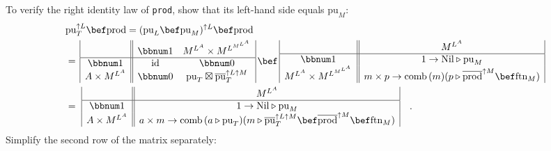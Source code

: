 To verify the right identity law of \lstinline!prod!, show that its
left-hand side equals $\text{pu}_{M}$:
\begin{align*}
 & \text{pu}_{T}^{\uparrow L}\bef\text{prod}=(\text{pu}_{L}\bef\text{pu}_{M})^{\uparrow L}\bef\text{prod}\\
 & =\,\begin{array}{|c||cc|}
 & \bbnum 1 & M^{L^{A}}\times M^{L^{M^{L^{A}}}}\\
\hline \bbnum 1 & \text{id} & \bbnum 0\\
A\times M^{L^{A}} & \bbnum 0 & \text{pu}_{T}\boxtimes\overline{\text{pu}}_{T}^{\uparrow L\uparrow M}
\end{array}\,\bef\,\begin{array}{|c||c|}
 & M^{L^{A}}\\
\hline \bbnum 1 & 1\rightarrow\text{Nil}\triangleright\text{pu}_{M}\\
M^{L^{A}}\times M^{L^{M^{L^{A}}}} & m\times p\rightarrow\text{comb}\,(m)(p\triangleright\overline{\text{prod}}^{\uparrow M}\bef\text{ftn}_{M})
\end{array}\\
 & =\,\,\begin{array}{|c||c|}
 & M^{L^{A}}\\
\hline \bbnum 1 & 1\rightarrow\text{Nil}\triangleright\text{pu}_{M}\\
A\times M^{L^{A}} & a\times m\rightarrow\text{comb}\,(a\triangleright\text{pu}_{T})(m\triangleright\overline{\text{pu}}_{T}^{\uparrow L\uparrow M}\bef\overline{\text{prod}}^{\uparrow M}\bef\text{ftn}_{M})
\end{array}\quad.
\end{align*}
Simplify the second row of the matrix separately:
